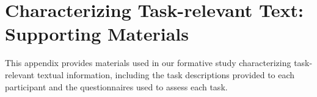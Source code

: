 \chapter{Characterizing Task-relevant Text: Supporting Materials}

This appendix provides materials used in our formative study characterizing task-relevant textual information,
including the task descriptions provided to each participant and the questionnaires used to assess each task.